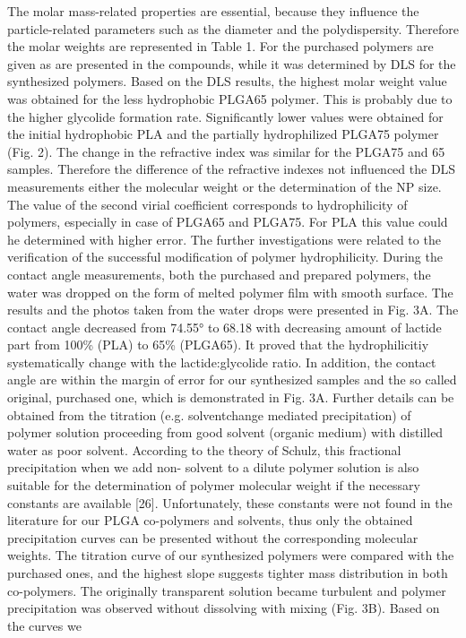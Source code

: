 \documentclass[11pt,letterpaper]{article}
\begin{document}
	The molar mass-related properties are essential, because they influence the particle-related parameters such as the diameter and the
	polydispersity. Therefore the molar weights are represented in Table 1.	
	For the purchased polymers are given as are presented in the compounds, while it was determined by DLS for the synthesized polymers.
	Based on the DLS results, the highest molar weight value was obtained
	for the less hydrophobic PLGA65 polymer. This is probably due to the
	higher glycolide formation rate. Significantly lower values were obtained for the initial hydrophobic PLA and the partially hydrophilized
	PLGA75 polymer (Fig. 2). The change in the refractive index was similar for the PLGA75 and 65 samples. Therefore the difference of the
	refractive indexes not influenced the DLS measurements either the
	molecular weight or the determination of the NP size. The value of the
	second virial coefficient corresponds to hydrophilicity of polymers,
	especially in case of PLGA65 and PLGA75. For PLA this value could he
	determined with higher error.
	The further investigations were related to the verification of the
	successful modification of polymer hydrophilicity. During the contact
	angle measurements, both the purchased and prepared polymers, the
	water was dropped on the form of melted polymer film with smooth
	surface. The results and the photos taken from the water drops were
	presented in Fig. 3A. The contact angle decreased from 74.55° to 68.18
	with decreasing amount of lactide part from 100\% (PLA) to 65\%
	(PLGA65). It proved that the hydrophilicitiy systematically change with
	the lactide:glycolide ratio. In addition, the contact angle are within the
	margin of error for our synthesized samples and the so called original,
	purchased one, which is demonstrated in Fig. 3A.
	Further details can be obtained from the titration (e.g. solventchange mediated precipitation) of polymer solution proceeding from
	good solvent (organic medium) with distilled water as poor solvent.
	According to the theory of Schulz, this fractional precipitation when we
	add non- solvent to a dilute polymer solution is also suitable for the
	determination of polymer molecular weight if the necessary constants
	are available [26]. Unfortunately, these constants were not found in the
	literature for our PLGA co-polymers and solvents, thus only the obtained precipitation curves can be presented without the corresponding
	molecular weights. The titration curve of our synthesized polymers
	were compared with the purchased ones, and the highest slope suggests tighter mass distribution in both co-polymers. The originally transparent solution became turbulent and polymer precipitation was observed without dissolving with mixing (Fig. 3B). Based on the curves we
\end{document}
